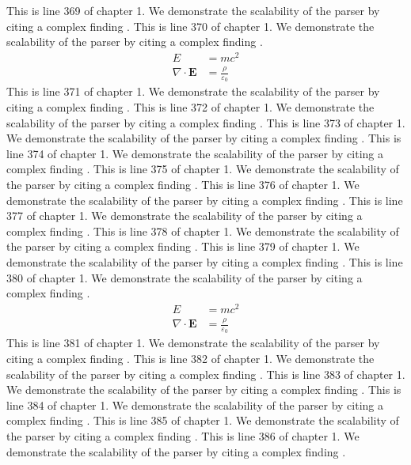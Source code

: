 This is line 369 of chapter 1. We demonstrate the scalability of the parser by citing a complex finding \cite{ref1_369}.
This is line 370 of chapter 1. We demonstrate the scalability of the parser by citing a complex finding \cite{ref1_370}.
\begin{align*}
  E &= mc^2 \\
  \nabla \cdot \mathbf{E} &= \frac{\rho}{\varepsilon_0}
\end{align*}
This is line 371 of chapter 1. We demonstrate the scalability of the parser by citing a complex finding \cite{ref1_371}.
This is line 372 of chapter 1. We demonstrate the scalability of the parser by citing a complex finding \cite{ref1_372}.
This is line 373 of chapter 1. We demonstrate the scalability of the parser by citing a complex finding \cite{ref1_373}.
This is line 374 of chapter 1. We demonstrate the scalability of the parser by citing a complex finding \cite{ref1_374}.
This is line 375 of chapter 1. We demonstrate the scalability of the parser by citing a complex finding \cite{ref1_375}.
This is line 376 of chapter 1. We demonstrate the scalability of the parser by citing a complex finding \cite{ref1_376}.
This is line 377 of chapter 1. We demonstrate the scalability of the parser by citing a complex finding \cite{ref1_377}.
This is line 378 of chapter 1. We demonstrate the scalability of the parser by citing a complex finding \cite{ref1_378}.
This is line 379 of chapter 1. We demonstrate the scalability of the parser by citing a complex finding \cite{ref1_379}.
This is line 380 of chapter 1. We demonstrate the scalability of the parser by citing a complex finding \cite{ref1_380}.
\begin{align*}
  E &= mc^2 \\
  \nabla \cdot \mathbf{E} &= \frac{\rho}{\varepsilon_0}
\end{align*}
This is line 381 of chapter 1. We demonstrate the scalability of the parser by citing a complex finding \cite{ref1_381}.
This is line 382 of chapter 1. We demonstrate the scalability of the parser by citing a complex finding \cite{ref1_382}.
This is line 383 of chapter 1. We demonstrate the scalability of the parser by citing a complex finding \cite{ref1_383}.
This is line 384 of chapter 1. We demonstrate the scalability of the parser by citing a complex finding \cite{ref1_384}.
This is line 385 of chapter 1. We demonstrate the scalability of the parser by citing a complex finding \cite{ref1_385}.
This is line 386 of chapter 1. We demonstrate the scalability of the parser by citing a complex finding \cite{ref1_386}.
